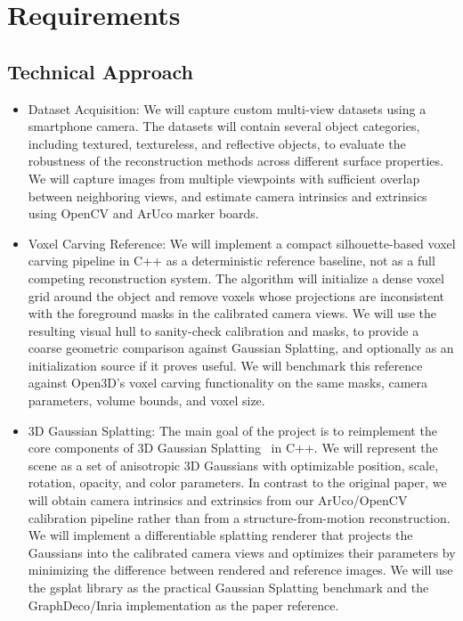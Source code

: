 \section{Requirements}
\label{sec:requirements}
\subsection{Technical Approach}
\begin{itemize}
\setlength{\itemsep}{0.5em}

\item Dataset Acquisition: We will capture custom multi-view datasets using a smartphone camera. The datasets will contain several object categories, including textured, textureless, and reflective objects, to evaluate the robustness of the reconstruction methods across different surface properties. We will capture images from multiple viewpoints with sufficient overlap between neighboring views, and estimate camera intrinsics and extrinsics using OpenCV and ArUco marker boards.

\item Voxel Carving Reference: We will implement a compact silhouette-based voxel carving pipeline in C++ as a deterministic reference baseline, not as a full competing reconstruction system. The algorithm will initialize a dense voxel grid around the object and remove voxels whose projections are inconsistent with the foreground masks in the calibrated camera views. We will use the resulting visual hull to sanity-check calibration and masks, to provide a coarse geometric comparison against Gaussian Splatting, and optionally as an initialization source if it proves useful. We will benchmark this reference against Open3D's voxel carving functionality on the same masks, camera parameters, volume bounds, and voxel size.

\item 3D Gaussian Splatting: The main goal of the project is to reimplement the core components of 3D Gaussian Splatting~\cite{Kerbl2023GaussianSplatting} in C++. We will represent the scene as a set of anisotropic 3D Gaussians with optimizable position, scale, rotation, opacity, and color parameters. In contrast to the original paper, we will obtain camera intrinsics and extrinsics from our ArUco/OpenCV calibration pipeline rather than from a structure-from-motion reconstruction. We will implement a differentiable splatting renderer that projects the Gaussians into the calibrated camera views and optimizes their parameters by minimizing the difference between rendered and reference images. We will use the gsplat library as the practical Gaussian Splatting benchmark and the GraphDeco/Inria implementation as the paper reference.


\end{itemize}
